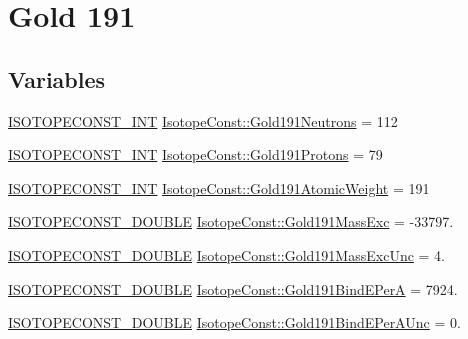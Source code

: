 \hypertarget{group___isotope_const-_gold-_au191}{}\section{Gold 191}
\label{group___isotope_const-_gold-_au191}
\subsection*{Variables}
\begin{DoxyCompactItemize}
\item 
\mbox{\hyperlink{group___isotope_const-_macros_ga5f18360b3e99483a35c32d789e62621c}{I\+S\+O\+T\+O\+P\+E\+C\+O\+N\+S\+T\+\_\+\+I\+NT}} \mbox{\hyperlink{group___isotope_const-_gold-_au191_ga1170adda5d40fb7353353a4b416188fd}{Isotope\+Const\+::\+Gold191\+Neutrons}} = 112
\item 
\mbox{\hyperlink{group___isotope_const-_macros_ga5f18360b3e99483a35c32d789e62621c}{I\+S\+O\+T\+O\+P\+E\+C\+O\+N\+S\+T\+\_\+\+I\+NT}} \mbox{\hyperlink{group___isotope_const-_gold-_au191_ga54ff93a99f8b8054e8788b0392cc2b49}{Isotope\+Const\+::\+Gold191\+Protons}} = 79
\item 
\mbox{\hyperlink{group___isotope_const-_macros_ga5f18360b3e99483a35c32d789e62621c}{I\+S\+O\+T\+O\+P\+E\+C\+O\+N\+S\+T\+\_\+\+I\+NT}} \mbox{\hyperlink{group___isotope_const-_gold-_au191_gae2fba30ed38eb3f151e867f61b33cc14}{Isotope\+Const\+::\+Gold191\+Atomic\+Weight}} = 191
\item 
\mbox{\hyperlink{group___isotope_const-_macros_ga8f45a7272ce02c0b4c65c44636ed719a}{I\+S\+O\+T\+O\+P\+E\+C\+O\+N\+S\+T\+\_\+\+D\+O\+U\+B\+LE}} \mbox{\hyperlink{group___isotope_const-_gold-_au191_gae6851620c1c92fe55efb7a81714ecb6d}{Isotope\+Const\+::\+Gold191\+Mass\+Exc}} = -\/33797.
\item 
\mbox{\hyperlink{group___isotope_const-_macros_ga8f45a7272ce02c0b4c65c44636ed719a}{I\+S\+O\+T\+O\+P\+E\+C\+O\+N\+S\+T\+\_\+\+D\+O\+U\+B\+LE}} \mbox{\hyperlink{group___isotope_const-_gold-_au191_ga62dd4ee13c61a3662aafe26e2f003d8a}{Isotope\+Const\+::\+Gold191\+Mass\+Exc\+Unc}} = 4.
\item 
\mbox{\hyperlink{group___isotope_const-_macros_ga8f45a7272ce02c0b4c65c44636ed719a}{I\+S\+O\+T\+O\+P\+E\+C\+O\+N\+S\+T\+\_\+\+D\+O\+U\+B\+LE}} \mbox{\hyperlink{group___isotope_const-_gold-_au191_ga0eb3e2c5e3819edf30ccb5e420b4a0bc}{Isotope\+Const\+::\+Gold191\+Bind\+E\+PerA}} = 7924.
\item 
\mbox{\hyperlink{group___isotope_const-_macros_ga8f45a7272ce02c0b4c65c44636ed719a}{I\+S\+O\+T\+O\+P\+E\+C\+O\+N\+S\+T\+\_\+\+D\+O\+U\+B\+LE}} \mbox{\hyperlink{group___isotope_const-_gold-_au191_ga07804d967ac7c492d81b29031b217a0f}{Isotope\+Const\+::\+Gold191\+Bind\+E\+Per\+A\+Unc}} = 0.

\end{DoxyCompactItemize}
